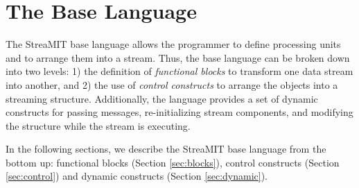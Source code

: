 \section{The Base Language}

The StreaMIT base language allows the programmer to define processing
units and to arrange them into a stream.  Thus, the base language can
be broken down into two levels: 1) the definition of {\it functional
blocks} to transform one data stream into another, and 2) the use of
{\it control constructs} to arrange the objects into a streaming
structure.  Additionally, the language provides a set of dynamic
constructs for passing messages, re-initializing stream components,
and modifying the structure while the stream is executing.

In the following sections, we describe the StreaMIT base language from
the bottom up: functional blocks (Section \ref{sec:blocks}), control
constructs (Section \ref{sec:control}) and dynamic constructs (Section
\ref{sec:dynamic}).


